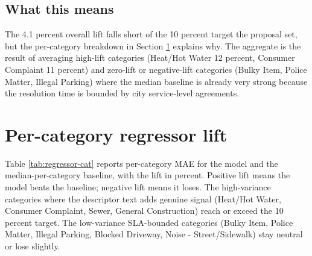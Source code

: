 \documentclass[11pt,letterpaper]{book}
\begin{document}
\subsection*{What this means}

The 4.1 percent overall lift falls short of the 10 percent target the proposal set, but the per-category breakdown in Section \ref{sec:results-regressor-cat} explains why. The aggregate is the result of averaging high-lift categories (Heat/Hot Water 12 percent, Consumer Complaint 11 percent) and zero-lift or negative-lift categories (Bulky Item, Police Matter, Illegal Parking) where the median baseline is already very strong because the resolution time is bounded by city service-level agreements.

\section{Per-category regressor lift}
\label{sec:results-regressor-cat}

Table \ref{tab:regressor-cat} reports per-category MAE for the model and the median-per-category baseline, with the lift in percent. Positive lift means the model beats the baseline; negative lift means it loses. The high-variance categories where the descriptor text adds genuine signal (Heat/Hot Water, Consumer Complaint, Sewer, General Construction) reach or exceed the 10 percent target. The low-variance SLA-bounded categories (Bulky Item, Police Matter, Illegal Parking, Blocked Driveway, Noise - Street/Sidewalk) stay neutral or lose slightly.
\end{document}
